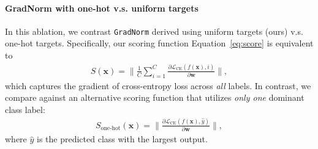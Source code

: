 \documentclass{article}
\def\*#1{\mathbf{#1}}
\begin{document}
\paragraph{{GradNorm} with one-hot v.s. uniform targets}



In this ablation, we contrast \texttt{GradNorm} derived using uniform targets (ours) v.s. one-hot targets. Specifically, our scoring function Equation~\ref{eq:score}  is equivalent to 
\begin{align}
    S(\*x) = \lVert \frac{1}{C}\sum_{i=1}^C \frac{\partial \mathcal{L}_\text{CE}(f(\*x),i)}{\partial \*w} \rVert,
\end{align}
which captures the gradient of cross-entropy loss across \emph{all} labels. In contrast, we compare against an alternative scoring function that utilizes \emph{only one} dominant class label:
\begin{align}
    S_\text{one-hot}(\*x) = \lVert \frac{\partial \mathcal{L}_\text{CE}(f(\*x),\hat y)}{\partial \*w} \rVert,
\end{align}
where $\hat y$ is the predicted class with the largest output. 

\end{document}
